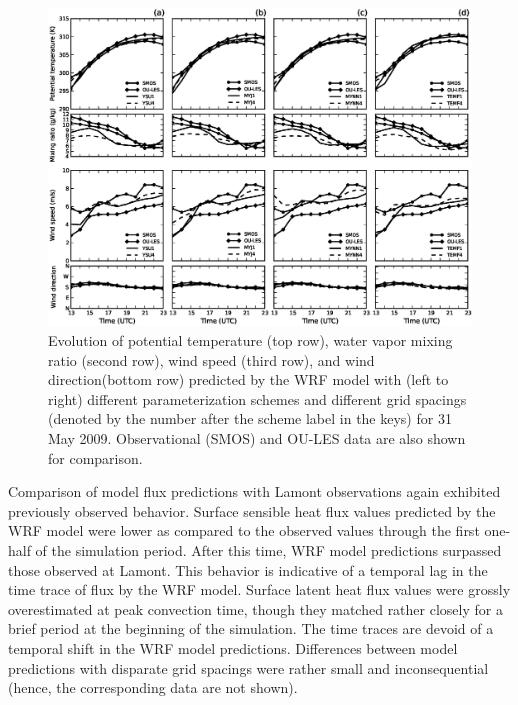\begin{figure}[ht!]
\begin{center}
\includegraphics[width=\textwidth]{figures/chapter4/meteogram_grid_20090531}
\end{center}
\caption{Evolution of potential temperature (top row), water vapor mixing ratio (second row), wind speed (third row), and wind direction(bottom row) predicted by the WRF model with (left to right) different parameterization schemes and different grid spacings (denoted by the number after the scheme label in the keys) for 31 May 2009. Observational (SMOS) and OU-LES data are also shown for comparison.}
\label{figure436}
\end{figure}


Comparison of model flux predictions with Lamont observations again exhibited previously observed behavior. Surface sensible heat flux values predicted by the WRF model were lower as compared to the observed values through the first one-half of the simulation period. After this time, WRF model predictions surpassed those observed at Lamont. This behavior is indicative of a temporal lag in the time trace of flux by the WRF model. Surface latent heat flux values were grossly overestimated at peak convection time, though they matched rather closely for a brief period at the beginning of the simulation. The time traces are devoid of a temporal shift in the WRF model predictions. Differences between model predictions with disparate grid spacings were rather small and inconsequential (hence, the corresponding data are not shown). 

